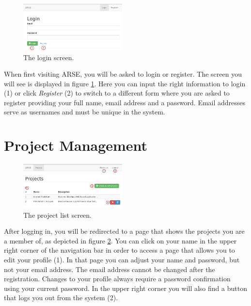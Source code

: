 \documentclass[
	accentcolor=tud1a %
]{tudreport}
\begin{document}
\begin{figure}
  	\centering
	\includegraphics[width=0.48\textwidth]{img/login}
	\caption{The login screen.}
	\label{fig:login}
\end{figure}

When first visiting ARSE, you will be asked to login or register. The screen you will see is displayed in figure \ref{fig:login}. Here you can input the right information to login (1) or click \emph{Register} (2) to switch to a different form where you are asked to register providing your full name, email address and a password. Email addresses serve as usernames and must be unique in the system.

\section{Project Management}
\label{sec:project-mgmt}

\begin{figure}
	\centering
	\includegraphics[width=0.48\textwidth]{img/projects}
	\caption{The project list screen.}
	\label{fig:project-list}
\end{figure}

After logging in, you will be redirected to a page that shows the projects you are a member of, as depicted in figure \ref{fig:project-list}. You can click on your name in the upper right corner of the navigation bar in order to access a page that allows you to edit your profile (1). In that page you can adjust your name and password, but not your email address. The email address cannot be changed after the registration. Changes to your profile always require a password confirmation using your current password. In the upper right corner you will also find a button that logs you out from the system (2).
\end{document}
